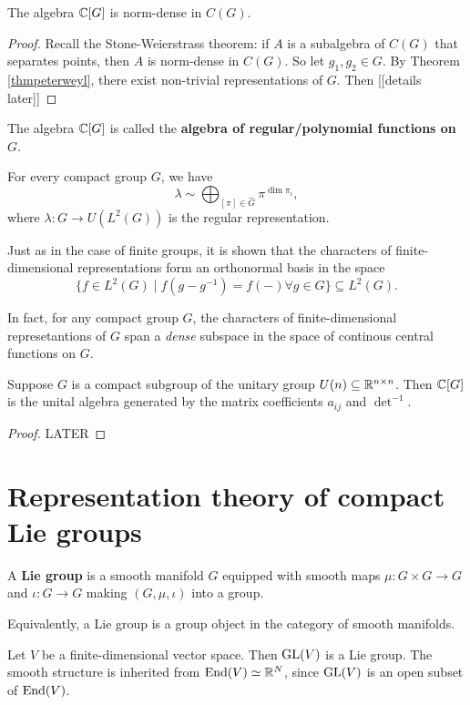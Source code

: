 \documentclass[11pt, english]{article}
\begin{document}
\begin{corr}
  The algebra $\mathbb{C}[G]$ is norm-dense in $C(G)$.
\end{corr}
\begin{proof}
Recall the Stone-Weierstrass theorem: if $A$ is a subalgebra of $C(G)$ that separates points, then $A$ is norm-dense in $C(G)$. So let $g_1,g_2 \in G$. By Theorem \ref{thmpeterweyl}, there exist non-trivial representations of $G$. Then [[details later]]
\end{proof}

The algebra $\mathbb{C}[G]$ is called the \textbf{algebra of regular/polynomial functions on $G$}.

\begin{thm}
  For every compact group $G$, we have 
$$
\lambda \sim \bigoplus_{[\pi] \in \widehat G} \pi^{\dim \pi_i},
$$
where $\lambda:G \to U(L^2(G))$ is the regular representation.
\end{thm}

Just as in the case of finite groups, it is shown that the characters of finite-dimensional representations form an orthonormal basis in the space 
$$
\{ f \in L^2(G) \mid f(g - g^{-1}) = f(-) \forall g \in G \} \subseteq L^2(G).
$$

In fact, for any compact group $G$, the characters of finite-dimensional represetantions of $G$ span a \emph{dense} subspace in the space of continous central functions on $G$. 

\begin{thm}
  Suppose $G$ is a compact subgroup of the unitary group $U(n) \subseteq \mathbb{R}^{n\times n}$. Then $\mathbb{C}[G]$ is the unital algebra generated by the matrix coefficients $a_{ij}$ and $\det^{-1}$. 
\end{thm}

\begin{proof}
  LATER
\end{proof}

\newpage
\section{Representation theory of compact Lie groups}

A \textbf{Lie group} is a smooth manifold $G$ equipped with smooth maps $\mu:G \times G \to G$ and $\iota:G \to G$ making $(G,\mu,\iota)$ into a group.

Equivalently, a Lie group is a group object in the category of smooth manifolds.

\begin{example}
 Let $V$ be a finite-dimensional vector space. Then $\operatorname{GL}(V)$ is a Lie group. The smooth structure is inherited from $\operatorname{End}(V) \simeq \mathbb{R}^N$, since $\operatorname{GL}(V)$ is an open subset of $\operatorname{End}(V)$.
\end{example}
\end{document}
